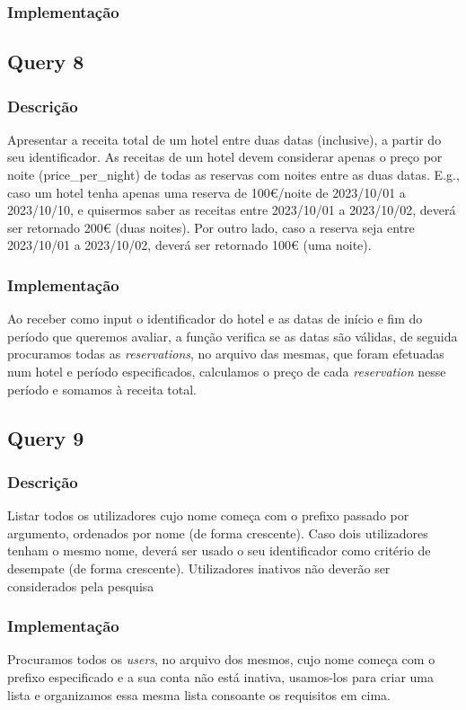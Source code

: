 \documentclass[11pt]{article}
\begin{document}
    
\subsubsection{Implementação}

\subsection{Query 8}
\subsubsection{Descrição}

Apresentar a receita total de um hotel entre duas datas (inclusive), a partir do seu identificador.
As receitas de um hotel devem considerar apenas o preço por noite (price_per_night) de todas as
reservas com noites entre as duas datas. E.g., caso um hotel tenha apenas uma reserva de 100€/noite
de 2023/10/01 a 2023/10/10, e quisermos saber as receitas entre 2023/10/01 a 2023/10/02, deverá ser
retornado 200€ (duas noites). Por outro lado, caso a reserva seja entre 2023/10/01 a 2023/10/02,
deverá ser retornado 100€ (uma noite).

\newpage
\subsubsection{Implementação}
Ao receber como input o identificador do hotel e as datas de início e fim do período que queremos avaliar, a função verifica se as datas são válidas, de seguida procuramos todas as \textit{reservations}, no arquivo das mesmas, que foram efetuadas num hotel e período especificados, calculamos o preço de cada \textit{reservation} nesse período e somamos à receita total.


\subsection{Query 9}
\subsubsection{Descrição}

Listar todos os utilizadores cujo nome começa com o prefixo passado por argumento, ordenados
por nome (de forma crescente). Caso dois utilizadores tenham o mesmo nome, deverá ser usado
o seu identificador como critério de desempate (de forma crescente). Utilizadores inativos não
deverão ser considerados pela pesquisa

\subsubsection{Implementação}
Procuramos todos os \textit{users}, no arquivo dos mesmos, cujo nome começa com o prefixo especificado e a sua conta não está inativa, usamos-los para criar uma lista e organizamos essa mesma lista consoante os requisitos em cima.
\end{document}
